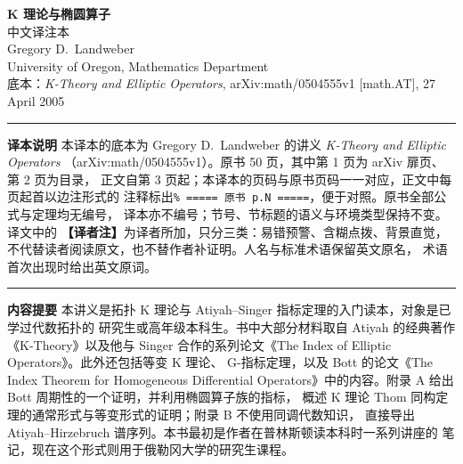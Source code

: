 



\begin{center}
  {\LARGE\bfseries K 理论与椭圆算子}\\[0.6em]
  {\large 中文译注本}\\[1.2em]
  {\large Gregory D.~Landweber}\\[0.3em]
  {\small University of Oregon, Mathematics Department}\\[1.2em]
  {\small 底本：\emph{K-Theory and Elliptic Operators}, arXiv:math/0504555v1 [math.AT], 27 April 2005}
\end{center}

\vspace{0.6em}
\noindent\rule{\textwidth}{0.4pt}
\begin{minipage}{\textwidth}
\small
\textbf{译本说明}\quad
本译本的底本为 Gregory D.~Landweber 的讲义 \emph{K-Theory and Elliptic Operators}
（arXiv:math/0504555v1）。原书 50 页，其中第 1 页为 arXiv 扉页、第 2 页为目录，
正文自第 3 页起；本译本的页码与原书页码一一对应，正文中每页起首以边注形式的
注释标出\texttt{\% ===== 原书 p.N =====}，便于对照。原书全部公式与定理均无编号，
译本亦不编号；节号、节标题的语义与环境类型保持不变。译文中的
\textbf{【译者注】}为译者所加，只分三类：易错预警、含糊点拨、背景直觉，
不代替读者阅读原文，也不替作者补证明。人名与标准术语保留英文原名，
术语首次出现时给出英文原词。
\end{minipage}
\noindent\rule{\textwidth}{0.4pt}

\vspace{1.2em}
\noindent\textbf{内容提要}\quad
本讲义是拓扑 K 理论与 Atiyah–Singer 指标定理的入门读本，对象是已学过代数拓扑的
研究生或高年级本科生。书中大部分材料取自 Atiyah 的经典著作《K-Theory》以及他与
Singer 合作的系列论文《The Index of Elliptic Operators》。此外还包括等变 K 理论、
G-指标定理，以及 Bott 的论文《The Index Theorem for Homogeneous Differential
Operators》中的内容。附录 A 给出 Bott 周期性的一个证明，并利用椭圆算子族的指标，
概述 K 理论 Thom 同构定理的通常形式与等变形式的证明；附录 B 不使用同调代数知识，
直接导出 Atiyah–Hirzebruch 谱序列。本书最初是作者在普林斯顿读本科时一系列讲座的
笔记，现在这个形式则用于俄勒冈大学的研究生课程。

\vspace{0.8em}

